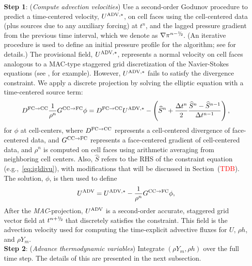 {\bf Step 1}: ({\it Compute advection velocities}) Use a second-order Godunov procedure to predict a time-centered
velocity, $U^{{\rm ADV},*}$, on cell faces using the cell-centered data (plus sources due to any auxiliary forcing) at $t^n$,
and the lagged pressure gradient from the previous time interval, which we denote as $\nabla \pi^{n-\myhalf}$.  
(An iterative procedure is used to define an initial pressure profile
for the algorithm; see \cite{AlmBelColHowWel98,DayBell:2000} for details.)
The provisional field, $U^{{\rm ADV},*}$, represents 
a normal velocity on cell faces analogous to a MAC-type staggered grid discretization of the 
Navier-Stokes equations (see \cite{harlowwelch}, for example).  However, $U^{{\rm ADV},*}$ fails to 
satisfy the divergence constraint.  We apply a discrete projection by solving the elliptic equation
with a time-centered source term:
\begin{equation}
D^{{\rm FC}\rightarrow{\rm CC}}\frac{1}{\rho^n}G^{{\rm CC}\rightarrow{\rm FC}}\phi = D^{{\rm FC}\rightarrow{\rm CC}}U^{{\rm ADV},*} - \left(\widehat S^n + \frac{\Delta t^n}{2}\frac{\widehat S^n - \widehat S^{n-1}}{\Delta t^{n-1}}\right),
\end{equation}
for $\phi$ at cell-centers, where $D^{{\rm FC}\rightarrow{\rm CC}}$ represents a cell-centered divergence of face-centered data,
and $G^{{\rm CC}\rightarrow{\rm FC}}$ represents a face-centered gradient of cell-centered data, and $\rho^n$ is computed on
cell faces using arithmetic averaging from neighboring cell centers.  Also, $\widehat S$ refers to the RHS of the constraint
equation (e.g.,~\ref{eq:igldivu}), with modifications that will be discussed in Section~(\textcolor{red}{TDB}).
The solution, $\phi$, is then used to define
\begin{equation}
U^{\rm ADV} = U^{{\rm ADV},*} - \frac{1}{\rho^n}G^{{\rm CC}\rightarrow{\rm FC}}\phi,
\end{equation}
After the \textit{MAC}-projection, $U^{\rm ADV}$ is a second-order accurate, staggered grid vector
field at $t^{n+\myhalf}$ that discretely satisfies the constraint.  This field is the advection velocity used for computing
the time-explicit advective fluxes for $U$, $\rho h$, and $\rho Y_m$.\\

{\bf Step 2}: ({\it Advance thermodynamic variables}) Integrate $(\rho Y_m,\rho h)$ over the full time step.  The details of this are presented in the next subsection.\\

